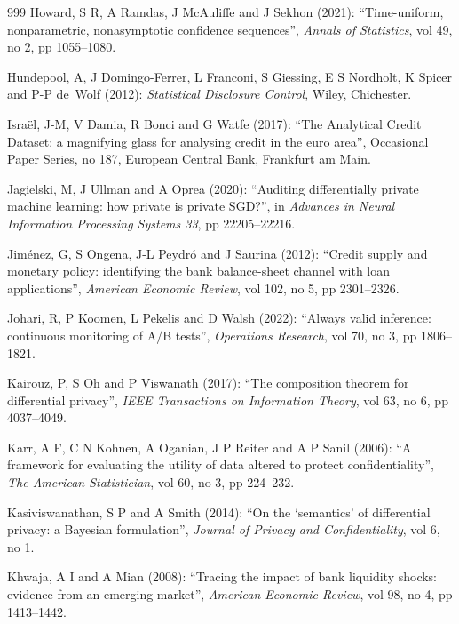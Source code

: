 \begin{thebibliography}{999}
Howard, S R, A Ramdas, J McAuliffe and J Sekhon (2021): ``Time-uniform, nonparametric, nonasymptotic confidence sequences'', \emph{Annals of Statistics}, vol 49, no 2, pp 1055--1080.

Hundepool, A, J Domingo-Ferrer, L Franconi, S Giessing, E S Nordholt, K Spicer and P-P de~Wolf (2012): \emph{Statistical Disclosure Control}, Wiley, Chichester.

Isra\"el, J-M, V Damia, R Bonci and G Watfe (2017): ``The Analytical Credit Dataset: a magnifying glass for analysing credit in the euro area'', Occasional Paper Series, no 187, European Central Bank, Frankfurt am Main.

Jagielski, M, J Ullman and A Oprea (2020): ``Auditing differentially private machine learning: how private is private SGD?'', in \emph{Advances in Neural Information Processing Systems 33}, pp 22205--22216.

Jim\'enez, G, S Ongena, J-L Peydr\'o and J Saurina (2012): ``Credit supply and monetary policy: identifying the bank balance-sheet channel with loan applications'', \emph{American Economic Review}, vol 102, no 5, pp 2301--2326.

Johari, R, P Koomen, L Pekelis and D Walsh (2022): ``Always valid inference: continuous monitoring of A/B tests'', \emph{Operations Research}, vol 70, no 3, pp 1806--1821.

Kairouz, P, S Oh and P Viswanath (2017): ``The composition theorem for differential privacy'', \emph{IEEE Transactions on Information Theory}, vol 63, no 6, pp 4037--4049.

Karr, A F, C N Kohnen, A Oganian, J P Reiter and A P Sanil (2006): ``A framework for evaluating the utility of data altered to protect confidentiality'', \emph{The American Statistician}, vol 60, no 3, pp 224--232.

Kasiviswanathan, S P and A Smith (2014): ``On the `semantics' of differential privacy: a Bayesian formulation'', \emph{Journal of Privacy and Confidentiality}, vol 6, no 1.

Khwaja, A I and A Mian (2008): ``Tracing the impact of bank liquidity shocks: evidence from an emerging market'', \emph{American Economic Review}, vol 98, no 4, pp 1413--1442.


\end{thebibliography}
